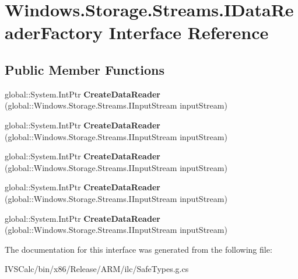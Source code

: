 \hypertarget{interface_windows_1_1_storage_1_1_streams_1_1_i_data_reader_factory}{}\section{Windows.\+Storage.\+Streams.\+I\+Data\+Reader\+Factory Interface Reference}
\label{interface_windows_1_1_storage_1_1_streams_1_1_i_data_reader_factory}
\subsection*{Public Member Functions}
\begin{DoxyCompactItemize}
\item 
\mbox{\label{interface_windows_1_1_storage_1_1_streams_1_1_i_data_reader_factory_a054cea7b070ee234f0d636b11952030d}} 
global\+::\+System.\+Int\+Ptr {\bfseries Create\+Data\+Reader} (global\+::\+Windows.\+Storage.\+Streams.\+I\+Input\+Stream input\+Stream)
\item 
\mbox{\label{interface_windows_1_1_storage_1_1_streams_1_1_i_data_reader_factory_a054cea7b070ee234f0d636b11952030d}} 
global\+::\+System.\+Int\+Ptr {\bfseries Create\+Data\+Reader} (global\+::\+Windows.\+Storage.\+Streams.\+I\+Input\+Stream input\+Stream)
\item 
\mbox{\label{interface_windows_1_1_storage_1_1_streams_1_1_i_data_reader_factory_a054cea7b070ee234f0d636b11952030d}} 
global\+::\+System.\+Int\+Ptr {\bfseries Create\+Data\+Reader} (global\+::\+Windows.\+Storage.\+Streams.\+I\+Input\+Stream input\+Stream)
\item 
\mbox{\label{interface_windows_1_1_storage_1_1_streams_1_1_i_data_reader_factory_a054cea7b070ee234f0d636b11952030d}} 
global\+::\+System.\+Int\+Ptr {\bfseries Create\+Data\+Reader} (global\+::\+Windows.\+Storage.\+Streams.\+I\+Input\+Stream input\+Stream)
\item 
\mbox{\label{interface_windows_1_1_storage_1_1_streams_1_1_i_data_reader_factory_a054cea7b070ee234f0d636b11952030d}} 
global\+::\+System.\+Int\+Ptr {\bfseries Create\+Data\+Reader} (global\+::\+Windows.\+Storage.\+Streams.\+I\+Input\+Stream input\+Stream)
\end{DoxyCompactItemize}


The documentation for this interface was generated from the following file\+:\begin{DoxyCompactItemize}
\item 
I\+V\+S\+Calc/bin/x86/\+Release/\+A\+R\+M/ilc/Safe\+Types.\+g.\+cs\end{DoxyCompactItemize}

